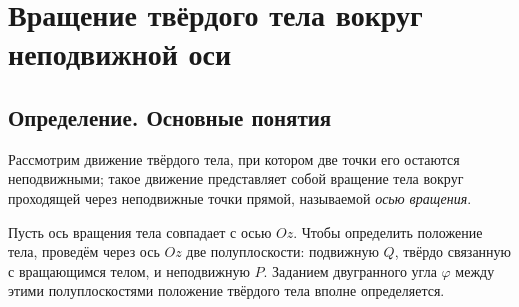 \section{Вращение твёрдого тела вокруг неподвижной оси}

\subsection{Определение. Основные понятия}

Рассмотрим движение твёрдого тела, при котором две точки его остаются
неподвижными; такое движение представляет собой вращение тела вокруг проходящей
через неподвижные точки прямой, называемой \textit{осью вращения}.

\begin{figure}[H]
  \centering

  \caption{}
  \label{fig:dihedral_angle}
\end{figure}

Пусть ось вращения тела совпадает с осью $Oz$. Чтобы определить положение тела,
проведём через ось $Oz$ две полуплоскости: подвижную $Q$, твёрдо связанную с
вращающимся телом, и неподвижную $P$. Заданием двугранного угла $\varphi$
между этими полуплоскостями положение твёрдого тела вполне определяется.


